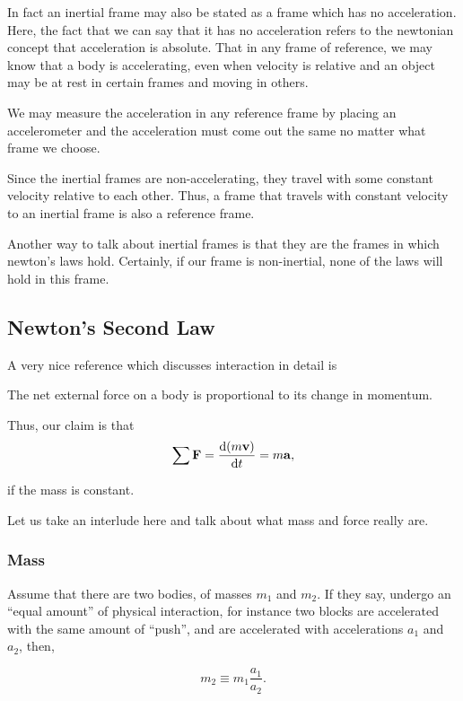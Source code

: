 In fact an inertial frame may also be stated as a frame which has no acceleration.
Here, the fact that we can say that it has no acceleration refers
to the newtonian concept that acceleration is absolute. That in any frame 
of reference, we may know that a body is accelerating, even when velocity is 
relative and an object may be at rest in certain frames and moving in others.

We may measure the acceleration in any reference frame by placing 
an accelerometer and the acceleration must come out the same no matter
what frame we choose.

Since the inertial frames are non-accelerating, they travel with some constant velocity 
relative to each other. Thus, a frame that travels with constant velocity 
to an inertial frame is also a reference frame.

Another way to talk about inertial frames is that they are the frames in which newton's laws
hold. Certainly, if our frame is non-inertial, none of the laws will hold in this frame.

\subsection{Newton's Second Law}
\label{sec: newton's second law}
A very nice reference which discusses interaction in detail is \cite{kleppner}

\begin{axioms}
     The net external force on a body is proportional to its change in 
    momentum.
\end{axioms}

Thus, our claim is that
\[\sum \mathbf{F} = \dv{(m\boldsymbol{\mathbf{v}})}{t} = m\boldsymbol{\mathbf{a}},\]

if the mass is constant. 

Let us take an interlude here and talk about what mass and force really are.

\subsubsection{Mass}

Assume that there are two bodies, of masses \(m_1\) and \(m_2\).
If they say, undergo an ``equal amount'' of physical interaction,
for instance two blocks are accelerated with the same amount 
of ``push'', and are accelerated with accelerations \(a_1\) and \(a_2\),
then,

\[m_2 \equiv m_1\frac{a_1}{a_2}.\]

